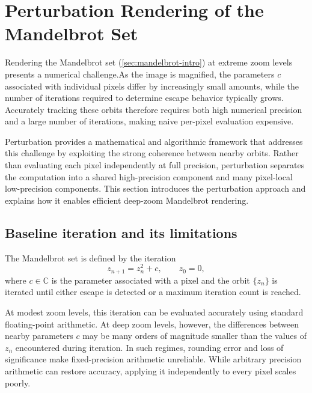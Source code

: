 \section{Perturbation Rendering of the Mandelbrot Set}
\label{sec:perturbation-concept}

Rendering the Mandelbrot set (\cref{sec:mandelbrot-intro}) at extreme zoom levels presents a
numerical challenge.As the image is magnified, the parameters \(c\) associated
with individual pixels differ by increasingly small amounts, while the number
of iterations required to determine escape behavior typically grows. Accurately
tracking these orbits therefore requires both high numerical precision and a
large number of iterations, making naive per-pixel evaluation
expensive.

Perturbation provides a mathematical and algorithmic framework
\cite{Martin2013Perturbation,HeilandAllen2013Perturbation,Wikibooks_Perturbation}
that addresses
this challenge by exploiting the strong coherence between nearby orbits. Rather
than evaluating each pixel independently at full precision, perturbation
separates the computation into a shared high-precision component and many
pixel-local low-precision components. This section introduces the perturbation
approach and explains how it enables efficient deep-zoom Mandelbrot rendering.

\subsection{Baseline iteration and its limitations}

The Mandelbrot set is defined by the iteration
\begin{equation}
z_{n+1} = z_n^2 + c, \qquad z_0 = 0,
\label{eq:mandelbrot-iter}
\end{equation}
where \(c \in \mathbb{C}\) is the parameter associated with a pixel and the orbit
\(\{z_n\}\) is iterated until either escape is detected or a maximum iteration
count is reached.

At modest zoom levels, this iteration can be evaluated accurately using standard
floating-point arithmetic. At deep zoom levels, however, the differences between
nearby parameters \(c\) may be many orders of magnitude smaller than the values
of \(z_n\) encountered during iteration. In such regimes, rounding error and
loss of significance make fixed-precision arithmetic unreliable. While arbitrary
precision arithmetic can restore accuracy, applying it independently to every
pixel scales poorly.

